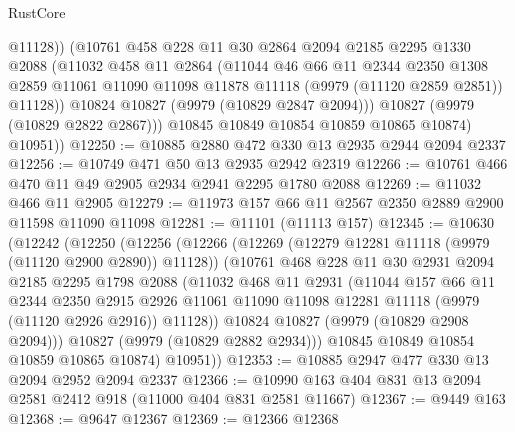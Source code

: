 \begin{lexlean}{RustCore}
\begin{coremodule}
                @11128))
            (@10761
              @458
              @228
              @11
              @30
              @2864
              @2094
              @2185
              @2295
              @1330
              @2088
              (@11032
                @458
                @11
                @2864
                (@11044
                  @46
                  @66
                  @11
                  @2344
                  @2350
                  @1308
                  @2859
                  @11061
                  @11090
                  @11098
                  @11878
                  @11118
                  (@9979 (@11120 @2859 @2851))
                  @11128))
              @10824
              @10827
              (@9979 (@10829 @2847 @2094)))
            @10827
            (@9979 (@10829 @2822 @2867)))
          @10845
          @10849
          @10854
          @10859
          @10865
          @10874)
        @10951))
@12250 := @10885 @2880 @472 @330 @13 @2935 @2944 @2094 @2337
@12256 := @10749 @471 @50 @13 @2935 @2942 @2319
@12266 := @10761 @466 @470 @11 @49 @2905 @2934 @2941 @2295 @1780 @2088
@12269 := @11032 @466 @11 @2905
@12279 := @11973 @157 @66 @11 @2567 @2350 @2889 @2900 @11598 @11090 @11098
@12281 := @11101 (@11113 @157)
@12345 := @10630
    (@12242
      (@12250
        (@12256
          (@12266
            (@12269 (@12279 @12281 @11118 (@9979 (@11120 @2900 @2890)) @11128))
            (@10761
              @468
              @228
              @11
              @30
              @2931
              @2094
              @2185
              @2295
              @1798
              @2088
              (@11032
                @468
                @11
                @2931
                (@11044
                  @157
                  @66
                  @11
                  @2344
                  @2350
                  @2915
                  @2926
                  @11061
                  @11090
                  @11098
                  @12281
                  @11118
                  (@9979 (@11120 @2926 @2916))
                  @11128))
              @10824
              @10827
              (@9979 (@10829 @2908 @2094)))
            @10827
            (@9979 (@10829 @2882 @2934)))
          @10845
          @10849
          @10854
          @10859
          @10865
          @10874)
        @10951))
@12353 := @10885 @2947 @477 @330 @13 @2094 @2952 @2094 @2337
@12366 := @10990 @163 @404 @831 @13 @2094 @2581 @2412 @918 (@11000 @404 @831 @2581 @11667)
@12367 := @9449 @163
@12368 := @9647 @12367
@12369 := @12366 @12368

\end{coremodule}
\end{lexlean}
